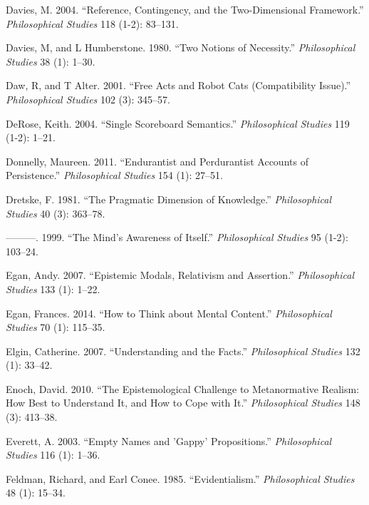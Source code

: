 \documentclass[
  10pt,
  letterpaper,
  DIV=11,
  numbers=noendperiod,
  twoside]{scrartcl}
\newlength{\cslhangindent}
\newenvironment{CSLReferences}[2] %
 {\begin{list}{}{%
  \setlength{\itemindent}{0pt}
  \setlength{\leftmargin}{0pt}
  \setlength{\parsep}{0pt}
  \ifodd #1
   \setlength{\leftmargin}{\cslhangindent}
   \setlength{\itemindent}{-1\cslhangindent}
  \fi
  \setlength{\itemsep}{#2\baselineskip}}}
 {\end{list}}
\begin{document}
\begin{CSLReferences}{1}{0}
Davies, M. 2004. {``Reference, Contingency, and the Two-Dimensional
Framework.''} \emph{Philosophical Studies} 118 (1-2): 83--131.

Davies, M, and L Humberstone. 1980. {``Two Notions of Necessity.''}
\emph{Philosophical Studies} 38 (1): 1--30.

Daw, R, and T Alter. 2001. {``Free Acts and Robot Cats (Compatibility
Issue).''} \emph{Philosophical Studies} 102 (3): 345--57.

DeRose, Keith. 2004. {``Single Scoreboard Semantics.''}
\emph{Philosophical Studies} 119 (1-2): 1--21.

Donnelly, Maureen. 2011. {``Endurantist and Perdurantist Accounts of
Persistence.''} \emph{Philosophical Studies} 154 (1): 27--51.

Dretske, F. 1981. {``The Pragmatic Dimension of Knowledge.''}
\emph{Philosophical Studies} 40 (3): 363--78.

---------. 1999. {``The Mind's Awareness of Itself.''}
\emph{Philosophical Studies} 95 (1-2): 103--24.

Egan, Andy. 2007. {``Epistemic Modals, Relativism and Assertion.''}
\emph{Philosophical Studies} 133 (1): 1--22.

Egan, Frances. 2014. {``How to Think about Mental Content.''}
\emph{Philosophical Studies} 70 (1): 115--35.

Elgin, Catherine. 2007. {``Understanding and the Facts.''}
\emph{Philosophical Studies} 132 (1): 33--42.

Enoch, David. 2010. {``The Epistemological Challenge to Metanormative
Realism: How Best to Understand It, and How to Cope with It.''}
\emph{Philosophical Studies} 148 (3): 413--38.

Everett, A. 2003. {``Empty Names and 'Gappy' Propositions.''}
\emph{Philosophical Studies} 116 (1): 1--36.

Feldman, Richard, and Earl Conee. 1985. {``Evidentialism.''}
\emph{Philosophical Studies} 48 (1): 15--34.


\end{CSLReferences}
\end{document}

